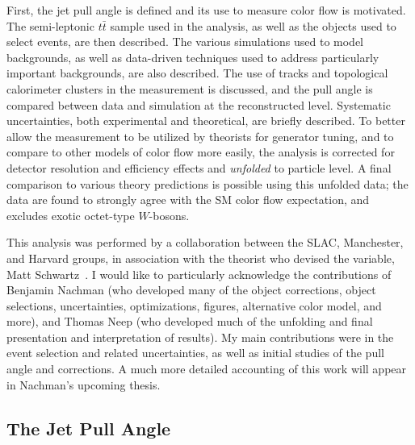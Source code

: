 First, the jet pull angle is defined and its use to measure color flow is motivated. The semi-leptonic $t\bar{t}$ sample used in the analysis, as well as the objects used to select events, are then described. The various simulations used to model backgrounds, as well as data-driven techniques used to address particularly important backgrounds, are also described. The use of tracks and topological calorimeter clusters in the measurement is discussed, and the pull angle is compared between data and simulation at the reconstructed level. Systematic uncertainties, both experimental and theoretical, are briefly described. To better allow the measurement to be utilized by theorists for generator tuning, and to compare to other models of color flow more easily, the analysis is corrected for detector resolution and efficiency effects and \textit{unfolded} to particle level. A final comparison to various theory predictions is possible using this unfolded data;  the data are found to strongly agree with the SM color flow expectation, and excludes exotic octet-type $W$-bosons.


This analysis was performed by a collaboration between the SLAC, Manchester, and Harvard groups, in association with the theorist who devised the variable, Matt Schwartz~\cite{Gallicchio:2010sw}. I would like to particularly acknowledge the contributions of Benjamin Nachman (who developed many of the object corrections, object selections, uncertainties, optimizations, figures, alternative color model, and more), and Thomas Neep (who developed much of the unfolding and final presentation and interpretation of results). My main contributions were in the event selection and related uncertainties, as well as initial studies of the pull angle and corrections. A much more detailed accounting of this work will appear in Nachman's upcoming thesis.



\subsection{The Jet Pull Angle}

